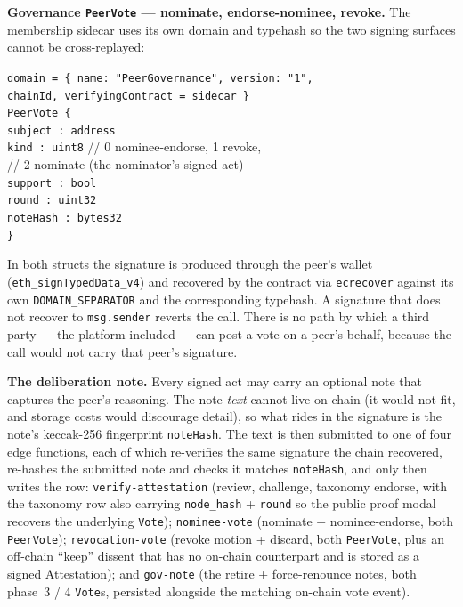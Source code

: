 \documentclass[11pt,a4paper]{article}
\begin{document}
\textbf{Governance \texttt{PeerVote} --- nominate, endorse-nominee,
revoke.} The membership sidecar uses its own domain and typehash so the
two signing surfaces cannot be cross-replayed:

\begin{plainbox}
\small
\texttt{domain = \{ name: "PeerGovernance", version: "1",}\\
\hspace*{2em}\texttt{chainId, verifyingContract = sidecar \}}\\[0.5em]
\texttt{PeerVote \{}\\
\hspace*{1.5em}\texttt{subject  : address}\\
\hspace*{1.5em}\texttt{kind     : uint8}\;\; // 0 nominee-endorse, 1 revoke,\\
\hspace*{1.5em}\hspace*{8em}     // 2 nominate (the nominator's signed act)\\
\hspace*{1.5em}\texttt{support  : bool}\\
\hspace*{1.5em}\texttt{round    : uint32}\\
\hspace*{1.5em}\texttt{noteHash : bytes32}\\
\texttt{\}}
\end{plainbox}

In both structs the signature is produced through the peer's wallet
(\texttt{eth\_signTypedData\_v4}) and recovered by the contract via
\texttt{ecrecover} against its own \texttt{DOMAIN\_SEPARATOR} and the
corresponding typehash. A signature that does not recover to
\texttt{msg.sender} reverts the call. There is no path by which a third
party --- the platform included --- can post a vote on a peer's behalf,
because the call would not carry that peer's signature.

\textbf{The deliberation note.} Every signed act may carry an optional
note that captures the peer's reasoning. The note \emph{text} cannot
live on-chain (it would not fit, and storage costs would discourage
detail), so what rides in the signature is the note's keccak-256
fingerprint \texttt{noteHash}. The text is then submitted to one of
four edge functions, each of which re-verifies the same signature the
chain recovered, re-hashes the submitted note and checks it matches
\texttt{noteHash}, and only then writes the row:
\texttt{verify-attestation} (review, challenge, taxonomy endorse, with
the taxonomy row also carrying \texttt{node\_hash} + \texttt{round} so
the public proof modal recovers the underlying \texttt{Vote});
\texttt{nominee-vote} (nominate + nominee-endorse, both
\texttt{PeerVote}); \texttt{revocation-vote} (revoke motion + discard,
both \texttt{PeerVote}, plus an off-chain ``keep'' dissent that has no
on-chain counterpart and is stored as a signed Attestation); and
\texttt{gov-note} (the retire + force-renounce notes, both phase~3 / 4
\texttt{Vote}s, persisted alongside the matching on-chain vote event).
\end{document}
